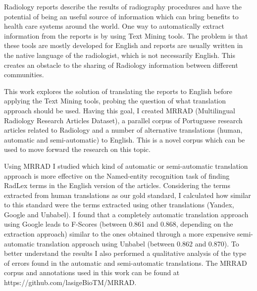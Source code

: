 \begin{abstracts}

Radiology reports describe the results of radiography procedures and have the potential of being an useful source of information which can bring benefits to health care systems around the world. One way to automatically extract information from the reports is by using Text Mining tools. The problem is that these tools are mostly developed for English and reports are usually written in the native language of the radiologist, which is not necessarily English. This creates an obstacle to the sharing of Radiology information between different communities.

This work explores the solution of translating the reports to English before applying the Text Mining tools, probing the question of what translation approach should be used. Having this goal, I created MRRAD (Multilingual Radiology Research Articles Dataset), a parallel corpus of Portuguese research articles related to Radiology and a number of alternative translations (human, automatic and semi-automatic) to English. This is a novel corpus which can be used to move forward the research on this topic.

Using MRRAD I studied which kind of automatic or semi-automatic translation approach is more effective on the Named-entity recognition task of finding RadLex terms in the English version of the articles. Considering the terms extracted from human translations as our gold standard, I calculated how similar to this standard were the terms extracted using other translations (Yandex, Google and Unbabel). I found that a completely automatic translation approach using Google leads to F-Scores (between 0.861 and 0.868, depending on the extraction approach) similar to the ones obtained through a more expensive semi-automatic translation approach using Unbabel (between 0.862 and 0.870). To better understand the results I also performed a qualitative analysis of the type of errors found in the automatic and semi-automatic translations. The MRRAD corpus and annotations used in this work can be found at https://github.com/lasigeBioTM/MRRAD.

\end{abstracts}
